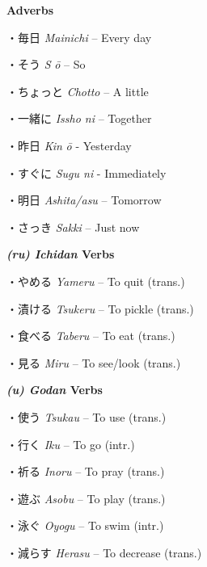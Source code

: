 \par{\textbf{Adverbs }}

\par{・毎日 \emph{Mainichi }– Every day }

\par{・そう \emph{S }\emph{ō }– So }

\par{・ちょっと \emph{Chotto }– A little }

\par{・一緒に \emph{Issho ni }– Together }

\par{・昨日 \emph{Kin }\emph{ō }- Yesterday }

\par{・すぐに \emph{Sugu ni }- Immediately }

\par{・明日 \emph{Ashita\slash asu }– Tomorrow }

\par{・さっき \emph{Sakki }– Just now }

\par{\textbf{\emph{(ru) Ichidan }Verbs }}

\par{・やめる \emph{Yameru }– To quit (trans.) }

\par{・漬ける \emph{Tsukeru }– To pickle (trans.) }

\par{・食べる \emph{Taberu }– To eat (trans.) }

\par{・見る \emph{Miru }– To see\slash look (trans.) }

\par{\textbf{\emph{(u) Godan }Verbs }}

\par{・使う \emph{Tsukau }– To use (trans.) }

\par{・行く \emph{Iku }– To go (intr.) }

\par{・祈る \emph{Inoru }– To pray (trans.) }

\par{・遊ぶ \emph{Asobu }– To play (trans.) }

\par{・泳ぐ \emph{Oyogu }– To swim (intr.) }

\par{・減らす \emph{Herasu }– To decrease (trans.) }

